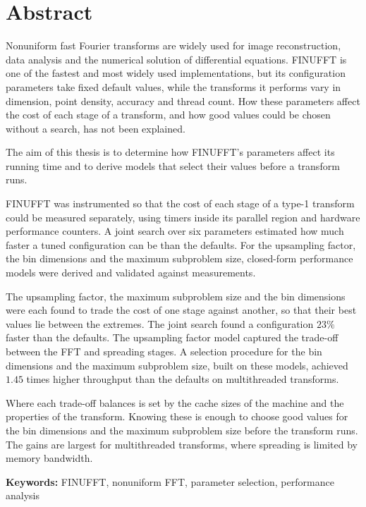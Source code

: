 \chapter*{Abstract}

Nonuniform fast Fourier transforms are widely used for image reconstruction,
data analysis and the numerical solution of differential equations. FINUFFT is
one of the fastest and most widely used implementations, but its configuration
parameters take fixed default values, while the transforms it performs vary in
dimension, point density, accuracy and thread count. How these parameters affect
the cost of each stage of a transform, and how good values could be chosen
without a search, has not been explained.

The aim of this thesis is to determine how FINUFFT's parameters affect its
running time and to derive models that select their values before a transform
runs.

FINUFFT was instrumented so that the cost of each stage of a type-1 transform
could be measured separately, using timers inside its parallel region and
hardware performance counters. A joint search over six parameters estimated how
much faster a tuned configuration can be than the defaults. For the upsampling
factor, the bin dimensions and the maximum subproblem size, closed-form
performance models were derived and validated against measurements.

The upsampling factor, the maximum subproblem size and the bin dimensions were
each found to trade the cost of one stage against another, so that their best
values lie between the extremes. The joint search found a
configuration $23\%$ faster than the defaults. The upsampling factor model
captured the trade-off between the FFT and spreading stages. A selection
procedure for the bin dimensions and the maximum subproblem size, built on these
models, achieved $1.45$ times higher throughput than the defaults on
multithreaded transforms.

Where each trade-off balances is set by the cache sizes of the machine and the
properties of the transform. Knowing these is enough to choose good values for
the bin dimensions and the maximum subproblem size before the transform runs.
The gains are largest for multithreaded transforms, where spreading is limited
by memory bandwidth.


\vspace{1cm}
\noindent\textbf{Keywords:} FINUFFT, nonuniform FFT, parameter selection, performance analysis
